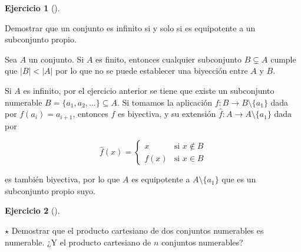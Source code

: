 \documentclass[
  spanish,
  a4paper,
]{scrreport}
\theoremstyle{definition}
\newtheorem{exercise}{Ejercicio}[chapter]
\theoremstyle{remark}
\begin{document}
\begin{exercise}[]\protect\hypertarget{exr-conjunto-equipotente-subconjunto}{}\label{exr-conjunto-equipotente-subconjunto}

Demostrar que un conjunto es infinito si y solo si es equipotente a un
subconjunto propio.

\end{exercise}

\begin{tcolorbox}[enhanced jigsaw, arc=.35mm, bottomrule=.15mm, bottomtitle=1mm, breakable, colback=white, colbacktitle=quarto-callout-tip-color!10!white, colframe=quarto-callout-tip-color-frame, coltitle=black, left=2mm, leftrule=.75mm, opacityback=0, opacitybacktitle=0.6, rightrule=.15mm, title=\textcolor{quarto-callout-tip-color}{\faLightbulb}\hspace{0.5em}{Solución}, titlerule=0mm, toprule=.15mm, toptitle=1mm]

Sea \(A\) un conjunto. Si \(A\) es finito, entonces cualquier
subconjunto \(B\subsetneq A\) cumple que \(|B| < |A|\) por lo que no se
puede establecer una biyección entre \(A\) y \(B\).

Si \(A\) es infinito, por el ejercicio anterior se tiene que existe un
subconjunto numerable \(B=\{a_1,a_2,\ldots\}\subseteq A\). Si tomamos la
aplicación \(f:B\to B\setminus\{a_1\}\) dada por \(f(a_i)=a_{i+1}\),
entonces \(f\) es biyectiva, y su extensión
\(\hat f: A\to A\setminus\{a_1\}\) dada por

\[
\hat f(x)=
\begin{cases}
x & \mbox{si } x\not\in B\\
f(x) & \mbox{si } x\in B
\end{cases}
\]

es también biyectiva, por lo que \(A\) es equipotente a
\(A\setminus \{a_1\}\) que es un subconjunto propio suyo.

\end{tcolorbox}

\begin{exercise}[]\protect\hypertarget{exr-producto-cartesiano-numerable}{}\label{exr-producto-cartesiano-numerable}

\(\star\) Demostrar que el producto cartesiano de dos conjuntos
numerables es numerable. ¿Y el producto cartesiano de \(n\) conjuntos
numerables?

\end{exercise}
\end{document}
